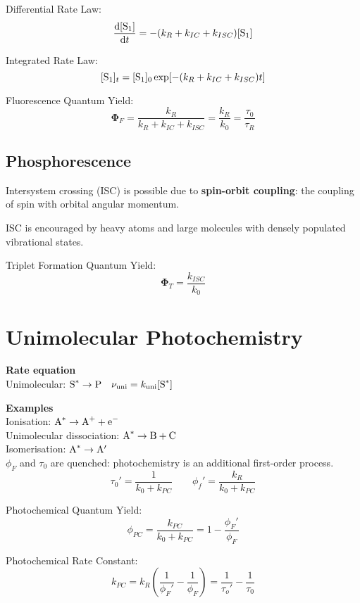 Differential Rate Law:
$$\frac{\mathrm{d}[\ce{S}_1]}{\mathrm{d}t} = -(k_R +k_{IC} +k_{ISC}) [\ce{S}_1]$$

Integrated Rate Law:
$$[\ce{S}_1]_t = [\ce{S}_1]_0 \exp[-(k_R + k_{IC} + k_{ISC})t]$$

Fluorescence Quantum Yield:
$$\mathbf{\Phi}_F = \frac{k_R}{k_R + k_{IC} + k_{ISC}} = \frac{k_R}{k_0} = \frac{\tau_0}{\tau_R}$$

\subsection*{Phosphorescence}

Intersystem crossing (ISC) is possible due to \textbf{spin-orbit coupling}: the coupling of  spin
with orbital angular momentum.

ISC is encouraged by heavy atoms and large molecules with densely populated vibrational states.
\vspace{\baselineskip}

Triplet Formation Quantum Yield:
$$\mathbf{\Phi}_T = \frac{k_{ISC}}{k_0}$$

\section{Unimolecular Photochemistry}

\textbf{Rate equation} \\
Unimolecular: $\ce{S^*} \rightarrow \ce{P} \quad \nu_{\mathrm{uni}} = k_{\mathrm{uni}}[\ce{S^*}]$
\vspace{\baselineskip}

\textbf{Examples} \\
Ionisation: $\ce{A^*} \rightarrow \ce{A+} + \ce{e-}$ \\
Unimolecular dissociation: $\ce{A^{*}} \rightarrow \ce{B} + \ce{C}$ \\
Isomerisation: $\ce{A^*} \rightarrow \ce{A}'$ \\

$\phi_F$ and $\tau_0$ are quenched: photochemistry is an additional first-order process.
$$\tau_0' = \frac{1}{k_0 + k_{PC}} \qquad \phi_f' = \frac{k_R}{k_0 + k_{PC}}$$

Photochemical Quantum Yield:
$$\phi_{PC} = \frac{k_{PC}}{k_0 + k_{PC}} = 1 - \frac{\phi_F'}{\phi_F}$$

Photochemical Rate Constant:
$$k_{PC} = k_R \left( \frac{1}{\phi_F'} - \frac{1}{\phi_F}\right) = \frac{1}{\tau_o'}- \frac{1}{\tau_0}$$



